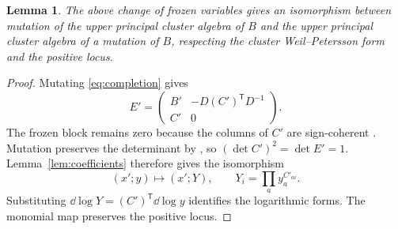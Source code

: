 \documentclass[12pt, letter]{amsart}
\newtheorem{lemma}[theorem]{Lemma}
\theoremstyle{definition}
\numberwithin{equation}{section}
\begin{document}
\begin{lemma} \label{lem: commute mutation and principal}
    The above change of frozen variables gives an isomorphism between mutation of the upper principal cluster algebra of $B$ and the upper principal cluster algebra of a mutation of $B$, respecting the cluster Weil--Petersson form and the positive locus.
\end{lemma}
\begin{proof}
    Mutating \eqref{eq:completion} gives
\[
 E'=\begin{pmatrix}
 B'&-D(C')^{\mathsf T}D^{-1}\\ C'&0
 \end{pmatrix}.
\]
The frozen block remains zero because the columns of $C'$ are
sign-coherent \cite[Theorem~2.4]{CL}.
Mutation preserves the determinant by \cite[Lemma~4.11]{HS}, so
$(\det C')^2=\det E'=1$.
Lemma~\ref{lem:coefficients} therefore gives the isomorphism
\[
 (x';y)\longmapsto(x';Y),\qquad
 Y_i=\prod_a y_a^{C'_{ai}}.
\]
Substituting $\dd\log Y=(C')^{\mathsf T}\dd\log y$ identifies
the logarithmic forms. The monomial map preserves the positive locus.
\end{proof}
\end{document}
